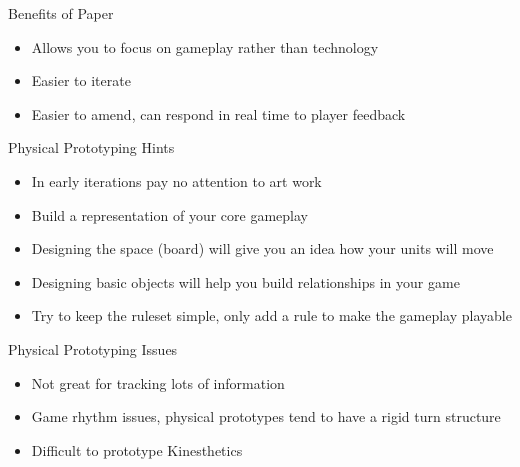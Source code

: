 \begin{frame}{Benefits of Paper}
	\begin{itemize}
		\item Allows you to focus on gameplay rather than technology
		\item Easier to iterate
		\item Easier to amend, can respond in real time to player feedback
	\end{itemize}
\end{frame}

\begin{frame}{Physical Prototyping Hints}
	\begin{itemize}
		\item In early iterations pay no attention to art work
		\item Build a representation of your core gameplay
		\item Designing the space (board) will give you an idea how your units will move
		\item Designing basic objects will help you build relationships in your game
		\item Try to keep the ruleset simple, only add a rule to make the gameplay playable
	\end{itemize}
\end{frame}

\begin{frame}{Physical Prototyping Issues}
	\begin{itemize}
		\item Not great for tracking lots of information
		\item Game rhythm issues, physical prototypes tend to have a rigid turn structure
		\item Difficult to prototype Kinesthetics
	\end{itemize}
\end{frame}
